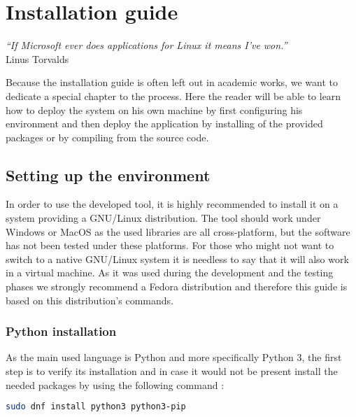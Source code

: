 

\chapter{Installation guide} %
\label{chap:installation}
\begin{flushright}
\textit{``If Microsoft ever does applications for Linux it means I've won.''} \\ Linus Torvalds
\end{flushright}


Because the installation guide is often left out in academic works, we want to dedicate a special chapter to the process. Here the reader will be able to learn how to deploy the system on his own machine by first configuring his environment and then deploy the application by installing of the provided packages or by compiling from the source code.

\section {Setting up the environment}

In order to use the developed tool, it is highly recommended to install it on a system providing a GNU/Linux distribution. The tool should work under Windows or MacOS as the used libraries are all cross-platform, but the software has not been tested under these platforms. For those who might not want to switch to a native GNU/Linux system it is needless to say that it will also work in a virtual machine. As it was used during the development and the testing phases we strongly recommend a Fedora distribution and therefore this guide is based on this distribution's commands.

\subsection{Python installation}

As the main used language is Python and more specifically Python 3, the first step is to verify its installation and in case it would not be present install the needed packages by using the following command :
\begin{lstlisting}[language=bash]
sudo dnf install python3 python3-pip
\end{lstlisting}

